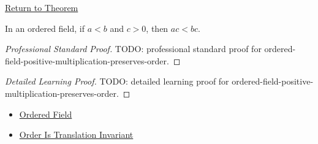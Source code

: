 \newpage
{}
\label{prf:ordered-field-positive-multiplication-preserves-order}

\begin{remark*}[Return]
\hyperref[thm:ordered-field-positive-multiplication-preserves-order]{Return to Theorem}
\end{remark*}

\begin{theorem*}
In an ordered field, if $a<b$ and $c>0$, then $ac<bc$.
\end{theorem*}

\begin{proof}[Professional Standard Proof]
\LRAProofBodyStart
TODO: professional standard proof for ordered-field-positive-multiplication-preserves-order.
\end{proof}

\begin{proof}[Detailed Learning Proof]
\LRAProofBodyStart
TODO: detailed learning proof for ordered-field-positive-multiplication-preserves-order.
\end{proof}

\begin{remark*}
\end{remark*}

\begin{dependencies}
\begin{itemize}
  \item \hyperref[def:ordered-field]{Ordered Field}
  \item \hyperref[thm:ordered-field-translation-invariant]{Order Is Translation Invariant}
\end{itemize}
\end{dependencies}

\clearpage

